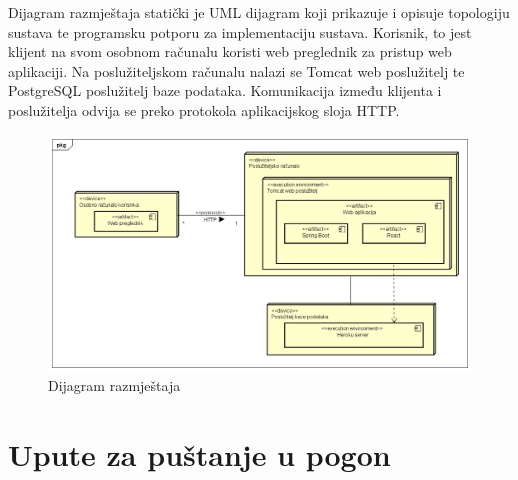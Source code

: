 			Dijagram razmještaja statički je UML dijagram koji prikazuje i opisuje topologiju sustava te programsku potporu za implementaciju sustava. Korisnik, to jest klijent na svom osobnom računalu koristi web preglednik za pristup web aplikaciji. Na poslužiteljskom računalu nalazi se Tomcat web poslužitelj te PostgreSQL poslužitelj baze podataka. Komunikacija između klijenta i poslužitelja odvija se preko protokola aplikacijskog sloja HTTP.
			
			\begin{figure}[H]
				\includegraphics[scale=0.4]{dijagrami/dijagramRazmjestaja1} %
				\centering
				\caption{Dijagram razmještaja}
				\label{fig:dijagramRazmjestaja}
			\end{figure}
			
			 
			\eject 
		
		\section{Upute za puštanje u pogon}
		
